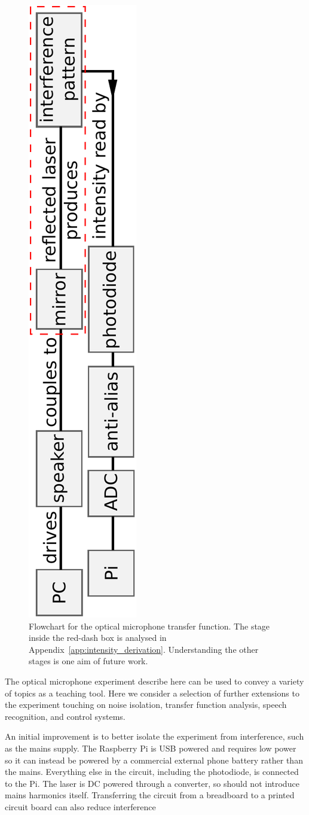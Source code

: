 \documentclass[paper-main.tex]{subfiles}
\begin{document}
\begin{figure}
	\includegraphics[height=.99\textwidth, angle=-90]{figures/pipeline.pdf}
	\caption{
Flowchart for the optical microphone transfer function. 
The stage inside the red-dash box is analysed in Appendix~\ref{app:intensity_derivation}. Understanding the other stages is one aim of future work. 
}
	\label{fig:pipeline_highlighted}
\end{figure}


The optical microphone experiment describe here can be used to convey a variety of topics as a teaching tool. 
Here we consider a selection of further extensions to the experiment touching on noise isolation, transfer function analysis, speech recognition, and control systems. 


An initial improvement is to better isolate the experiment from interference, such as the mains supply. 
The Raspberry Pi is USB powered and requires low power so it can instead be powered by a commercial external phone battery rather than the mains. 
Everything else in the circuit, including the photodiode, is connected to the Pi. 
The laser is DC powered through a converter, so should not introduce mains harmonics itself. 
Transferring the circuit from a breadboard to a printed circuit board can also reduce interference~\cite{elfekey2013design}

\end{document}
